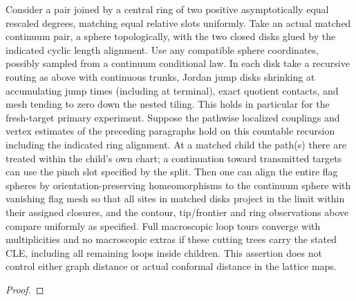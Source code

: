 \begin{proposition}\label{cut:disk-spatial}

Consider a pair joined by a central ring of two positive asymptotically equal rescaled degrees, matching equal relative slots uniformly.
Take an actual matched continuum pair, a sphere topologically, with the two closed disks glued by the indicated cyclic length alignment.
Use any compatible sphere coordinates, possibly sampled from a continuum conditional law.
In each disk take a recursive routing as above with continuous trunks, Jordan jump disks shrinking at accumulating jump times (including at terminal), exact quotient contacts, and mesh tending to zero down the nested tiling.
This holds in particular for the fresh-target primary experiment.
Suppose the pathwise localized couplings and vertex estimates of the preceding paragraphs hold on this countable recursion including the indicated ring alignment.
At a matched child the path(s) there are treated within the child's own chart; a continuation toward transmitted targets can use the pinch slot specified by the split.
Then one can align the entire flag spheres by orientation-preserving homeomorphisms to the continuum sphere with vanishing flag mesh so that all sites in matched disks project in the limit within their assigned closures, and the contour, tip/frontier and ring observations above compare uniformly as specified.
Full macroscopic loop tours converge with multiplicities and no macroscopic extras if these cutting trees carry the stated CLE, including all remaining loops inside children.
This assertion does not control either graph distance or actual conformal distance in the lattice maps.

\end{proposition}\begin{proof}\leavevmode



\end{proof}

